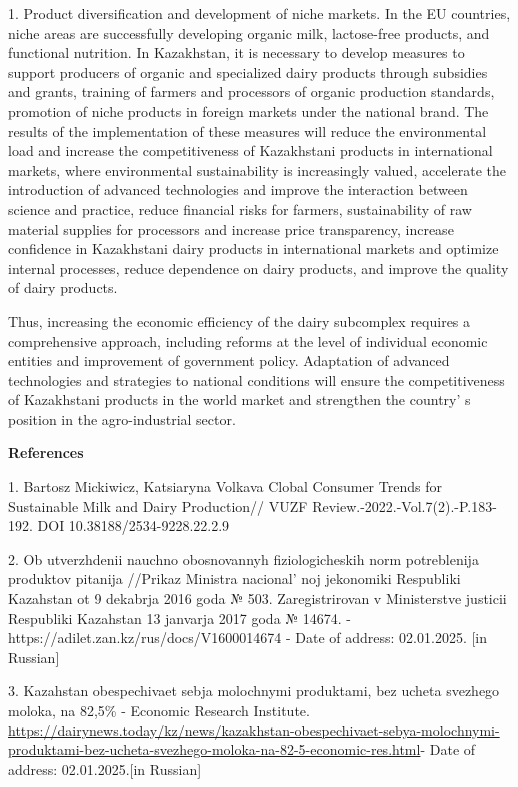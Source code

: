 1. Product diversification and development of niche markets. In the EU
countries, niche areas are successfully developing organic milk,
lactose-free products, and functional nutrition. In Kazakhstan, it is
necessary to develop measures to support producers of organic and
specialized dairy products through subsidies and grants, training of
farmers and processors of organic production standards, promotion of
niche products in foreign markets under the national brand.
The results of the implementation of these measures will reduce the
environmental load and increase the competitiveness of Kazakhstani
products in international markets, where environmental sustainability is
increasingly valued, accelerate the introduction of advanced
technologies and improve the interaction between science and practice,
reduce financial risks for farmers, sustainability of raw material
supplies for processors and increase price transparency, increase
confidence in Kazakhstani dairy products in international markets and
optimize internal processes, reduce dependence on dairy products, and
improve the quality of dairy products.

Thus, increasing the economic efficiency of the dairy subcomplex
requires a comprehensive approach, including reforms at the level of
individual economic entities and improvement of government policy.
Adaptation of advanced technologies and strategies to national
conditions will ensure the competitiveness of Kazakhstani products in
the world market and strengthen the country' s position
in the agro-industrial sector.

{\bfseries References}

1. Bartosz Mickiwicz, Katsiaryna Volkava Clobal Consumer Trends for
Sustainable Milk and Dairy Production// VUZF
Review.-2022.-Vol.7(2).-P.183-192. DOI 10.38188/2534-9228.22.2.9

2. Ob utverzhdenii nauchno obosnovannyh fiziologicheskih norm
potreblenija produktov pitanija //Prikaz Ministra
nacional' noj jekonomiki Respubliki Kazahstan ot 9
dekabrja 2016 goda № 503. Zaregistrirovan v Ministerstve justicii
Respubliki Kazahstan 13 janvarja 2017 goda № 14674. -
https://adilet.zan.kz/rus/docs/V1600014674 - Date of address:
02.01.2025. {[}in Russian{]}

3. Kazahstan obespechivaet sebja molochnymi produktami, bez ucheta
svezhego moloka, na 82,5\% - Economic Research Institute.
\url{https://dairynews.today/kz/news/kazakhstan-obespechivaet-sebya-molochnymi-produktami-bez-ucheta-svezhego-moloka-na-82-5-economic-res.html}-
Date of address: 02.01.2025.{[}in Russian{]}

